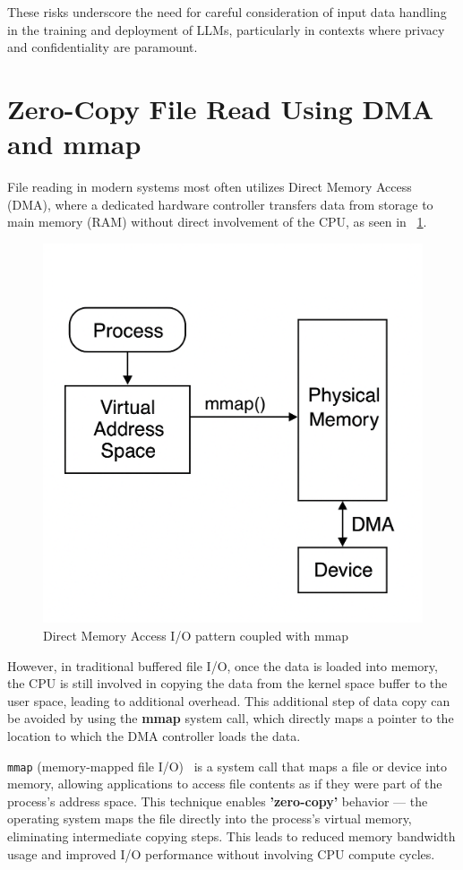 These risks underscore the need for careful consideration of input data handling in the training and deployment of LLMs, particularly in contexts where privacy and confidentiality are paramount.
\section{Zero-Copy File Read Using DMA and mmap}
\label{sec:ZeroCopyRead}
File reading in modern systems most often utilizes Direct Memory Access (DMA), where a dedicated hardware controller transfers data from storage to main memory (RAM) without direct involvement of the CPU, as seen in ~\ref{fig:dma-mmap}.
\begin{figure}[h]
    \centering
    \includegraphics[width=0.6\linewidth]{images/dma-mmap.png}
    \caption{Direct Memory Access I/O pattern coupled with mmap}
    \label{fig:dma-mmap}
\end{figure}

However, in traditional buffered file I/O, once the data is loaded into memory, the CPU is still involved in copying the data from the kernel space buffer to the user space, leading to additional overhead. This additional step of data copy can be avoided by using the \textbf{mmap} system call, which directly maps a pointer to the location to which the DMA controller loads the data.

\texttt{mmap} (memory-mapped file I/O)~\cite{man7_mmap} is a system call that maps a file or device into memory, allowing applications to access file contents as if they were part of the process's address space. This technique enables \textbf{'zero-copy'} behavior — the operating system maps the file directly into the process’s virtual memory, eliminating intermediate copying steps. This leads to reduced memory bandwidth usage and improved I/O performance without involving CPU compute cycles.

